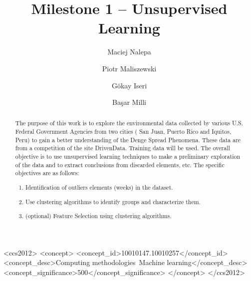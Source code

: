 \documentclass[sigconf]{acmart}
\begin{document}
\title{Milestone 1 -- Unsupervised Learning}

\author{Maciej Nalepa}
\affiliation{}

\author{Piotr Maliszewski}
\affiliation{}

\author{Gökay Iseri}
\affiliation{}

\author{Başar Milli}
\affiliation{}

\renewcommand{\shortauthors}{Nalepa Maliszewski Iseri Milli}

\begin{abstract}
The purpose of this work is to explore the environmental data collected by various U.S.
Federal Government Agencies from two cities ( San Juan, Puerto Rico and Iquitos, Peru) to
gain a better understanding of the Denge Spread Phenomena.
These data are from a competition of the site DrivenData. Training data will be used.
The overall objective is to use unsupervised learning techniques to make a preliminary exploration of the data and to extract conclusions from discarded elements, etc. The specific
objectives are as follows:

\begin{enumerate}
    \item Identification of outliers elements (weeks) in the dataset.
    \item Use clustering algorithms to identify groups and characterize them.
    \item (optional) Feature Selection using clustering algorithms.
\end{enumerate}

\end{abstract}

\begin{CCSXML}
<ccs2012>
   <concept>
       <concept_id>10010147.10010257</concept_id>
       <concept_desc>Computing methodologies~Machine learning</concept_desc>
       <concept_significance>500</concept_significance>
       </concept>
 </ccs2012>
\end{CCSXML}



\maketitle
\end{document}
